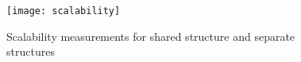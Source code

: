 \begin{figure}[th]
	\centering
	\texttt{[image: scalability]}
	\caption[Scalability measurements for different methods of noise generation]{
		Scalability measurements for shared \serverDS{} structure \protocolGamma{} and separate \serverDS{} structures \protocolNoGamma{}
	}%
	\label{figure:scalability}
\end{figure}
